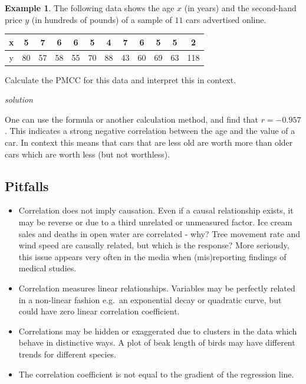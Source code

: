 \documentclass[
]{book}
\theoremstyle{definition}
\theoremstyle{definition}
\newtheorem{example}{Example}[chapter]
\theoremstyle{definition}
\theoremstyle{definition}
\theoremstyle{remark}
\begin{document}
\begin{example}
The following data shows the age \(x\) (in years) and the second-hand price \(y\) (in hundreds of pounds) of a sample of \(11\) cars advertised online.

\begin{longtable}[]{@{}cccccccccccc@{}}
\toprule
x & 5 & 7 & 6 & 6 & 5 & 4 & 7 & 6 & 5 & 5 & 2\tabularnewline
\midrule
\endhead
y & 80 & 57 & 58 & 55 & 70 & 88 & 43 & 60 & 69 & 63 & 118\tabularnewline
\bottomrule
\end{longtable}

Calculate the PMCC for this data and interpret this in context.

\emph{solution}

One can use the formula or another calculation method, and find that \(r = -0.957\). This indicates a strong negative correlation between the age and the value of a car. In context this means that cars that are less old are worth more than older cars which are worth less (but not worthless).
\end{example}

\hypertarget{pitfalls}{%
\subsection{Pitfalls}\label{pitfalls}}

\begin{itemize}
\item
  Correlation does not imply causation. Even if a causal relationship exists, it may be reverse or due to a third unrelated or unmeasured factor. Ice cream sales and deaths in open water are correlated - why? Tree movement rate and wind speed are causally related, but which is the response? More seriously, this issue appears very often in the media when (mis)reporting findings of medical studies.
\item
  Correlation measures linear relationships. Variables may be perfectly related in a non-linear fashion e.g.~an exponential decay or quadratic curve, but could have zero linear correlation coefficient.
\item
  Correlations may be hidden or exaggerated due to clusters in the data which behave in distinctive ways. A plot of beak length of birds may have different trends for different species.
\item
  The correlation coefficient is not equal to the gradient of the regression line.
\end{itemize}
\end{document}
